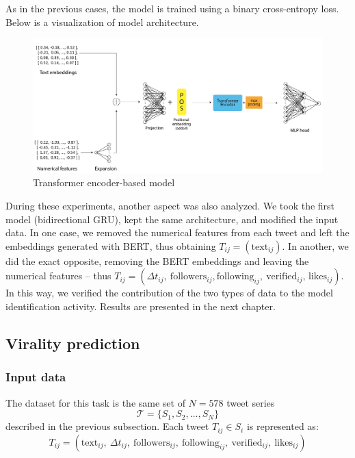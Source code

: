 \documentclass[a4paper,twoside,12pt]{book}
\begin{document}
As in the previous cases, the model is trained using a binary cross-entropy loss. Below is a visualization of model architecture.\\

\begin{figure}
	\centering
	\includegraphics[width=1.1\textwidth]{./img/3_seq_model.png}
	\caption{Transformer encoder-based model}
\end{figure}


During these experiments, another aspect was also analyzed. We took the first model (bidirectional GRU), kept the same architecture, and modified the input data. In one case, we removed the numerical features from each tweet and left the embeddings generated with BERT, thus obtaining $T_{ij} = (\text{text}_{ij})$. In another, we did the exact opposite, removing the BERT embeddings and leaving the numerical features -- thus  $T_{ij} = (\Delta t_{ij},\ \text{followers}_{ij}, \allowbreak \text{following}_{ij},\ \text{verified}_{ij},\, \allowbreak \text{likes}_{ij} )$. In this way, we verified the contribution of the two types of data to the model identification activity. Results are presented in the next chapter.

\vspace{2em}

\subsection{Virality prediction}
\subsubsection*{Input data}

The dataset for this task is the same set of $N = 578$ tweet series
\[
\mathcal{T} = \{ S_1, S_2, \dots, S_N \}
\]
described in the previous subsection. Each tweet $T_{ij} \in S_i$ is represented as:
\[
T_{ij} = \left( \text{text}_{ij},\ \Delta t_{ij},\ \text{followers}_{ij},\ \text{following}_{ij},\ \text{verified}_{ij},\ \text{likes}_{ij} \right)
\]
\end{document}
